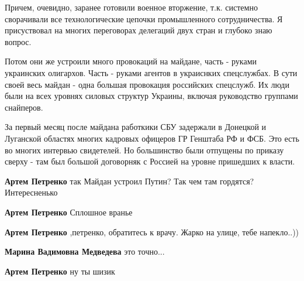 \begin{itemize}
\begin{itemize}
Причем, очевидно, заранее готовили военное вторжение, т.к. системно сворачивали
все технологические цепочки промышленного сотрудничества. Я присуствовал на
многих переговорах делегаций двух стран и глубоко знаю вопрос.

Потом они же устроили много провокаций на майдане, часть - руками украинских
олигархов. Часть - руками агентов в украиснких спецслужбах. В сути своей весь
майдан - одна большая провокация российских спецслужб. Их люди были на всех
уровнях силовых структур Украины, включая руководство группами снайперов.

За первый месяц после майдана работкики СБУ задержали в Донецкой и Луганской
областях многих кадровых офицеров ГР Генштаба РФ и ФСБ. Это есть во многих
интервью свидетелей. Но большинство были отпущены по приказу сверху - там был
большой договорняк с Россией на уровне пришедших к власти.


 
\textbf{Артем Петренко} так Майдан устроил Путин? Так чем там гордятся? Интересненько 🤨

 
\textbf{Артем Петренко} Сплошное вранье

 
\textbf{Артем Петренко} ,петренко, обратитесь к врачу. Жарко на улице, тебе напекло..))

 
\textbf{Марина Вадимовна Медведева} это точно...

 
\textbf{Артем Петренко} ну ты шизик

 

\end{itemize}
\end{itemize}
